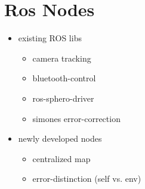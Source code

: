 \section{Ros Nodes}
\begin{itemize}
	\item{existing ROS libs}
	\begin{itemize}
		\item{camera tracking}
		\item{bluetooth-control}
		\item{ros-sphero-driver}
		\item{simones error-correction}
	\end{itemize}
	\item{newly developed nodes}
	\begin{itemize}
		\item{centralized map}
		\item{error-distinction (self vs. env)}
	\end{itemize}
\end{itemize}